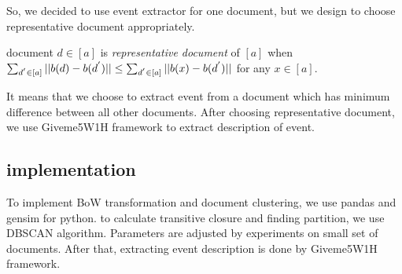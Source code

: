So, we decided to use event extractor for one document, but we design to choose
representative document appropriately.

\begin{definition}
    document $d \in [a]$ is \textit{representative document} of $[a]$ when
    $\sum_{d^{'} \in [a]} ||b(d) - b(d^{'})|| \\ \leq \sum_{d^{'} \in [a]} ||b(x) - b(d^{'})||$ 
    for any $x \in [a]$.
\end{definition}

It means that we choose to extract event from a document which has
minimum difference between all other documents. After choosing representative
document, we use Giveme5W1H framework\cite{Hamborg2019b} to extract description of event.

\subsection{implementation}

To implement BoW transformation and document clustering, we use pandas and gensim for python.
to calculate transitive closure and finding partition, we use DBSCAN algorithm. Parameters
are adjusted by experiments on small set of documents. After that, extracting event
description is done by Giveme5W1H framework.
